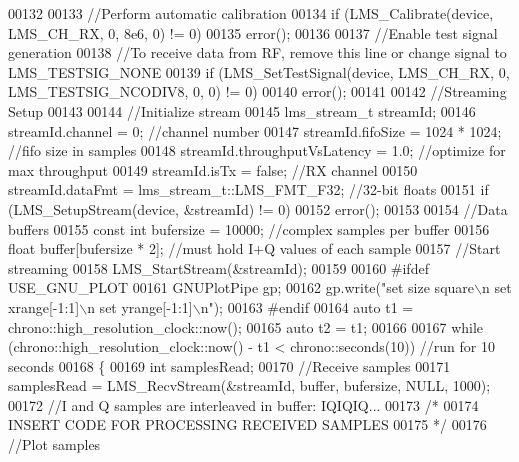 \begin{DoxyCode}
00132 
00133     \textcolor{comment}{//Perform automatic calibration}
00134     \textcolor{keywordflow}{if} (LMS_Calibrate(device, LMS_CH_RX, 0, 8e6, 0) != 0)
00135         error();
00136 
00137     \textcolor{comment}{//Enable test signal generation}
00138     \textcolor{comment}{//To receive data from RF, remove this line or change signal to LMS\_TESTSIG\_NONE}
00139     \textcolor{keywordflow}{if} (LMS_SetTestSignal(device, LMS_CH_RX, 0, LMS_TESTSIG_NCODIV8, 0, 0) != 0)
00140         error();
00141 
00142     \textcolor{comment}{//Streaming Setup}
00143 
00144     \textcolor{comment}{//Initialize stream}
00145     lms_stream_t streamId;
00146     streamId.channel = 0; \textcolor{comment}{//channel number}
00147     streamId.fifoSize = 1024 * 1024; \textcolor{comment}{//fifo size in samples}
00148     streamId.throughputVsLatency = 1.0; \textcolor{comment}{//optimize for max throughput}
00149     streamId.isTx = \textcolor{keyword}{false}; \textcolor{comment}{//RX channel}
00150     streamId.dataFmt = lms_stream_t::LMS_FMT_F32; \textcolor{comment}{//32-bit floats}
00151     \textcolor{keywordflow}{if} (LMS_SetupStream(device, &streamId) != 0)
00152         error();
00153 
00154     \textcolor{comment}{//Data buffers}
00155     \textcolor{keyword}{const} \textcolor{keywordtype}{int} bufersize = 10000; \textcolor{comment}{//complex samples per buffer}
00156     \textcolor{keywordtype}{float} buffer[bufersize * 2]; \textcolor{comment}{//must hold I+Q values of each sample}
00157     \textcolor{comment}{//Start streaming}
00158     LMS_StartStream(&streamId);
00159 
00160 \textcolor{preprocessor}{#ifdef USE\_GNU\_PLOT}
00161     GNUPlotPipe gp;
00162     gp.write(\textcolor{stringliteral}{"set size square\(\backslash\)n set xrange[-1:1]\(\backslash\)n set yrange[-1:1]\(\backslash\)n"});
00163 \textcolor{preprocessor}{#endif}
00164     \textcolor{keyword}{auto} t1 = chrono::high\_resolution\_clock::now();
00165     \textcolor{keyword}{auto} t2 = t1;
00166 
00167     \textcolor{keywordflow}{while} (chrono::high\_resolution\_clock::now() - t1 < chrono::seconds(10)) \textcolor{comment}{//run for 10 seconds}
00168     \{
00169         \textcolor{keywordtype}{int} samplesRead;
00170         \textcolor{comment}{//Receive samples}
00171         samplesRead = LMS_RecvStream(&streamId, buffer, bufersize, NULL, 1000);
00172         \textcolor{comment}{//I and Q samples are interleaved in buffer: IQIQIQ...}
00173     \textcolor{comment}{/*}
00174 \textcolor{comment}{        INSERT CODE FOR PROCESSING RECEIVED SAMPLES}
00175 \textcolor{comment}{    */}
00176         \textcolor{comment}{//Plot samples}

\end{DoxyCode}
